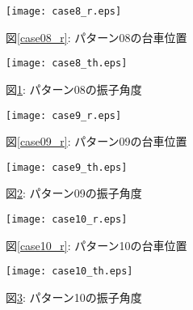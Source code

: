 \begin{figure}[htbp]
    \begin{minipage}{0.5\hsize}
        \begin{center}
            \texttt{[image: case8\_r.eps]}
            \caption{図\ref{case08_r}: パターン08の台車位置}
            \label{case08_r}
        \end{center}
    \end{minipage}
    \begin{minipage}{0.5\hsize}
        \begin{center}
            \texttt{[image: case8\_th.eps]}
            \caption{図\ref{case08_th}: パターン08の振子角度}
            \label{case08_th}
        \end{center}
    \end{minipage}
\end{figure}

\begin{figure}[htbp]
    \begin{minipage}{0.5\hsize}
        \begin{center}
            \texttt{[image: case9\_r.eps]}
            \caption{図\ref{case09_r}: パターン09の台車位置}
            \label{case09_r}
        \end{center}
    \end{minipage}
    \begin{minipage}{0.5\hsize}
        \begin{center}
            \texttt{[image: case9\_th.eps]}
            \caption{図\ref{case09_th}: パターン09の振子角度}
            \label{case09_th}
        \end{center}
    \end{minipage}
\end{figure}

\begin{figure}[htbp]
    \begin{minipage}{0.5\hsize}
        \begin{center}
            \texttt{[image: case10\_r.eps]}
            \caption{図\ref{case10_r}: パターン10の台車位置}
            \label{case10_r}
        \end{center}
    \end{minipage}
    \begin{minipage}{0.5\hsize}
        \begin{center}
            \texttt{[image: case10\_th.eps]}
            \caption{図\ref{case10_th}: パターン10の振子角度}
            \label{case10_th}
        \end{center}
    \end{minipage}
\end{figure}

